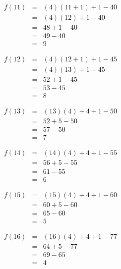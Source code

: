 \documentclass[12pt]{scrartcl}
\begin{document}
\begin{enumerate}
	\begin{eqnarray}
		f(11)		&	=	& 	(4)(11 + 1)  + 1 - 40\nonumber \\
				&	=	&	(4)(12) + 1 - 40 \nonumber \\
				&	=	&	48 + 1 - 40 \nonumber \\
				&	=	&	49 - 40 \nonumber \\
				&	=	&	9 \nonumber
	\end{eqnarray}
	
	\begin{eqnarray}
		f(12)		&	=	& 	(4)(12 + 1)  + 1 - 45\nonumber \\
				&	=	&	(4)(13) + 1 - 45 \nonumber \\
				&	=	&	52 + 1 - 45 \nonumber \\
				&	=	&	53 - 45 \nonumber \\
				&	=	&	8 \nonumber
	\end{eqnarray}
	
	\begin{eqnarray}
		f(13)		&	=	& 	(13)(4)  + 4 + 1 - 50\nonumber \\
				&	=	&	52 + 5 - 50 \nonumber \\
				&	=	&	57 - 50 \nonumber \\
				&	=	&	7 \nonumber
	\end{eqnarray}
	
	\begin{eqnarray}
		f(14)		&	=	& 	(14)(4)  + 4 + 1 - 55\nonumber \\
				&	=	&	56 + 5 - 55 \nonumber \\
				&	=	&	61 - 55 \nonumber \\
				&	=	&	6 \nonumber
	\end{eqnarray}
	
	\begin{eqnarray}
		f(15)		&	=	& 	(15)(4)  + 4 + 1 - 60\nonumber \\
				&	=	&	60 + 5 - 60 \nonumber \\
				&	=	&	65 - 60 \nonumber \\
				&	=	&	5 \nonumber	
	\end{eqnarray}
	
	\begin{eqnarray}
		f(16)		&	=	& 	(16)(4)  + 4 + 1 - 77\nonumber \\
				&	=	&	64 + 5 - 77 \nonumber \\
				&	=	&	69 - 65 \nonumber \\
				&	=	&	4 \nonumber
	\end{eqnarray}
	

\end{enumerate}
\end{document}
